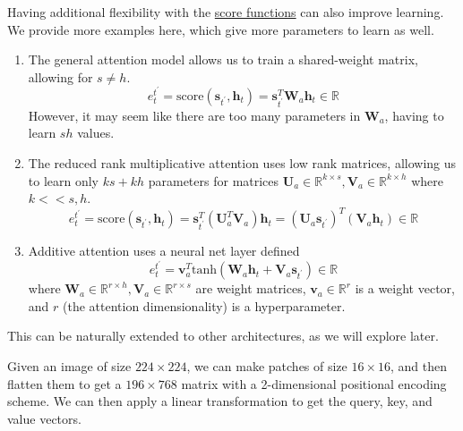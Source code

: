   \begin{example}
    \label{ex:score-functions}
    Having additional flexibility with the \hyperref[def:score-function]{score functions} can also improve learning. We provide more examples here, which give more parameters to learn as well.  
    \begin{enumerate}
      \item The general attention model allows us to train a shared-weight matrix, allowing for $s \neq h$. 
      \begin{equation}
        e^{t^\prime}_t = \mathrm{score}(\mathbf{s}_{t^\prime}, \mathbf{h}_t) = \mathbf{s}_{t^\prime}^T \mathbf{W}_a \mathbf{h}_t \in \mathbb{R}
      \end{equation}
      However, it may seem like there are too many parameters in $\mathbf{W}_a$, having to learn $sh$ values. 

      \item The reduced rank multiplicative attention uses low rank matrices, allowing us to learn only $ks + kh$ parameters for matrices $\mathbf{U}_a \in \mathbb{R}^{k \times s}, \mathbf{V}_a \in \mathbb{R}^{k \times h}$ where $k << s, h$. 
      \begin{equation}
        e^{t^\prime}_t = \mathrm{score}(\mathbf{s}_{t^\prime}, \mathbf{h}_t) = \mathbf{s}_{t^\prime}^T (\mathbf{U}_a^T \mathbf{V}_a) \mathbf{h}_t = (\mathbf{U}_a \mathbf{s}_{t^\prime})^T (\mathbf{V}_a \mathbf{h}_t) \in \mathbb{R}
      \end{equation}

      \item Additive attention uses a neural net layer defined 
      \begin{equation}
        e^{t^\prime}_t = \mathbf{v}_a^T \mathrm{tanh}(\mathbf{W}_a \mathbf{h}_t + \mathbf{V}_a \mathbf{s}_{t^\prime}) \in \mathbb{R}
      \end{equation}
      where $\mathbf{W}_a \in \mathbb{R}^{r \times h}, \mathbf{V}_a \in \mathbb{R}^{r \times s}$ are weight matrices, $\mathbf{v}_a \in \mathbb{R}^r$ is a weight vector, and $r$ (the attention dimensionality) is a hyperparameter. 
    \end{enumerate}
  \end{example}

  This can be naturally extended to other architectures, as we will explore later. 

  \begin{example}[Images]
    \label{ex:images}
    Given an image of size $224 \times 224$, we can make patches of size $16 \times 16$, and then flatten them to get a $196 \times 768$ matrix with a 2-dimensional positional encoding scheme. We can then apply a linear transformation to get the query, key, and value vectors.
  \end{example}

